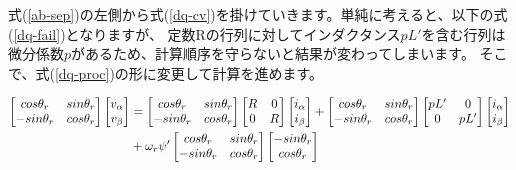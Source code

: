 式(\ref{ab-sep})の左側から式(\ref{dq-cv})を掛けていきます。単純に考えると、以下の式(\ref{dq-fail})となりますが、
定数Rの行列に対してインダクタンス$pL'$を含む行列は微分係数$p$があるため、計算順序を守らないと結果が変わってしまいます。
そこで、式(\ref{dq-proc})の形に変更して計算を進めます。
\begin{fleqn}[8pt]
{\large
\begin{align}
    \begin{bmatrix}
        cos\theta_{r} & sin\theta_{r} \\
        -sin\theta_{r} & cos\theta_{r}
    \end{bmatrix}
    \begin{bmatrix}
        v_{\alpha} \\
        v_{\beta}
    \end{bmatrix}
    &=
    \begin{bmatrix}
        cos\theta_{r} & sin\theta_{r} \\
        -sin\theta_{r} & cos\theta_{r}
    \end{bmatrix}
    \begin{bmatrix}
        R & 0 \\
        0 & R
    \end{bmatrix}
    \begin{bmatrix}
        i_{\alpha} \\
        i_{\beta}
    \end{bmatrix}
    +
    \begin{bmatrix}
        cos\theta_{r} & sin\theta_{r} \\
        -sin\theta_{r} & cos\theta_{r}
    \end{bmatrix}
    \begin{bmatrix}
        pL' & 0 \\
        0 & pL'
    \end{bmatrix}
    \begin{bmatrix}
        i_{\alpha} \\
        i_{\beta}
    \end{bmatrix}
    \notag \\
    &+ \omega_{r}\psi'
    \begin{bmatrix}
        cos\theta_{r} & sin\theta_{r} \\
        -sin\theta_{r} & cos\theta_{r}
    \end{bmatrix}
    \begin{bmatrix}
        -sin\theta_{r} \\
        cos\theta_{r}
    \end{bmatrix}
    \label{dq-fail}
\end{align}

}
\end{fleqn}
